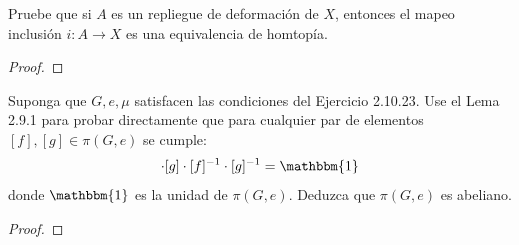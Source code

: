\documentclass[12pt]{report}
\theoremstyle{largebreak}
\newcommand\cf[3]{\ensuremath{#1:#2\rightarrow#3}}
\newcommand{\bbm}[1]{\ensuremath{\mathbbm{#1}}}
\begin{document}
    \begin{excer}
        Pruebe que si $A$ es un repliegue de deformación de $X$, entonces el mapeo inclusión $\cf{i}{A}{X}$ es una equivalencia de homtopía.
    \end{excer}

    \begin{proof}
        
    \end{proof}

    \begin{excer}
        Suponga que $G,e,\mu$ satisfacen las condiciones del Ejercicio 2.10.23. Use el Lema 2.9.1 para probar directamente que para cualquier par de elementos $[f],[g]\in\pi(G,e)$ se cumple:
        \begin{equation*}
            [f]\cdot[g]\cdot[f]^{-1}\cdot[g]^{-1}=\bbm{1}
        \end{equation*}
        donde $\bbm{1}$ es la unidad de $\pi(G,e)$. Deduzca que $\pi(G,e)$ es abeliano.
    \end{excer}

    \begin{proof}
        
    \end{proof}
\end{document}
